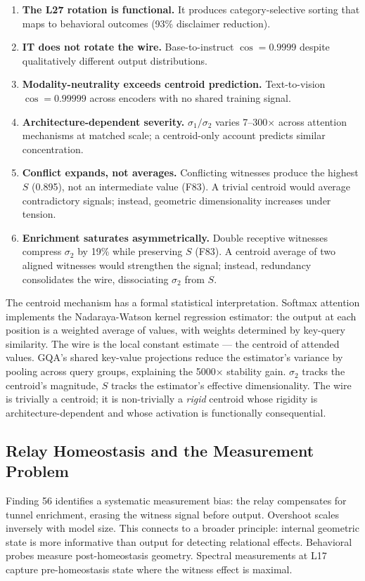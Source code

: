 \documentclass[12pt]{article}
\begin{document}
\begin{enumerate}
\item \textbf{The L27 rotation is functional.} It produces category-selective sorting that maps to behavioral outcomes (93\% disclaimer reduction).
\item \textbf{IT does not rotate the wire.} Base-to-instruct $\cos = 0.9999$ despite qualitatively different output distributions.
\item \textbf{Modality-neutrality exceeds centroid prediction.} Text-to-vision $\cos = 0.99999$ across encoders with no shared training signal.
\item \textbf{Architecture-dependent severity.} $\sigma_1/\sigma_2$ varies 7--300$\times$ across attention mechanisms at matched scale; a centroid-only account predicts similar concentration.
\item \textbf{Conflict expands, not averages.} Conflicting witnesses produce the highest $S$ (0.895), not an intermediate value (F83). A trivial centroid would average contradictory signals; instead, geometric dimensionality increases under tension.
\item \textbf{Enrichment saturates asymmetrically.} Double receptive witnesses compress $\sigma_2$ by 19\% while preserving $S$ (F83). A centroid average of two aligned witnesses would strengthen the signal; instead, redundancy consolidates the wire, dissociating $\sigma_2$ from $S$.
\end{enumerate}

The centroid mechanism has a formal statistical interpretation. Softmax attention implements the Nadaraya-Watson kernel regression estimator: the output at each position is a weighted average of values, with weights determined by key-query similarity. The wire is the local constant estimate --- the centroid of attended values. GQA's shared key-value projections reduce the estimator's variance by pooling across query groups, explaining the 5000$\times$ stability gain. $\sigma_2$ tracks the centroid's magnitude, $S$ tracks the estimator's effective dimensionality. The wire is trivially a centroid; it is non-trivially a \textit{rigid} centroid whose rigidity is architecture-dependent and whose activation is functionally consequential.

\subsection{Relay Homeostasis and the Measurement Problem}

Finding 56 identifies a systematic measurement bias: the relay compensates for tunnel enrichment, erasing the witness signal before output. Overshoot scales inversely with model size. This connects to a broader principle: internal geometric state is more informative than output for detecting relational effects. Behavioral probes measure post-homeostasis geometry. Spectral measurements at L17 capture pre-homeostasis state where the witness effect is maximal.
\end{document}
